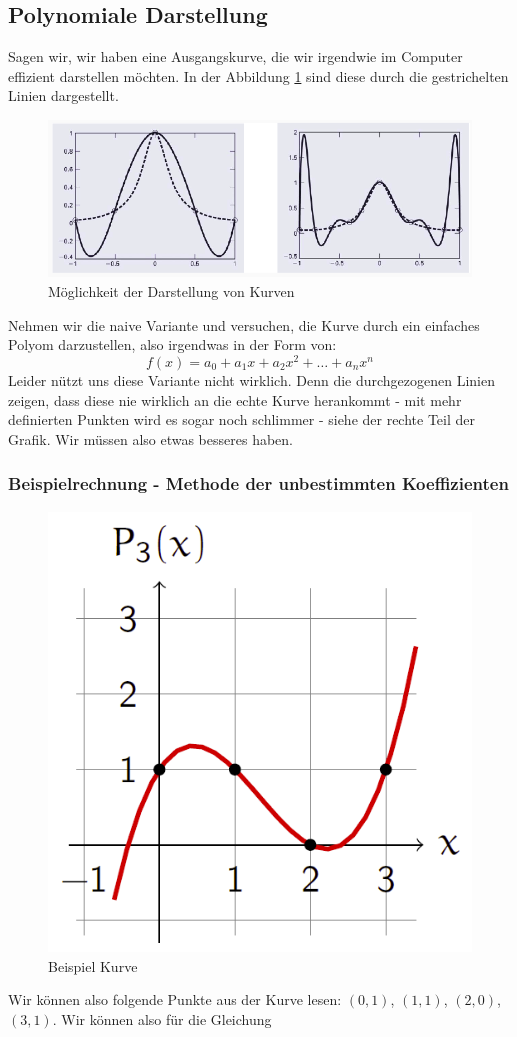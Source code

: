 \subsection{Polynomiale Darstellung}
Sagen wir, wir haben eine Ausgangskurve, die wir irgendwie im Computer effizient darstellen möchten. In der Abbildung \ref{fig:kurven_interpolieren} sind diese durch die gestrichelten Linien dargestellt. 
\begin{figure}[!ht]
	\centering
	\includegraphics[width=0.5\linewidth]{fig/kurven_interpolieren}
	\caption{Möglichkeit der Darstellung von Kurven}
	\label{fig:kurven_interpolieren}
\end{figure}
Nehmen wir die naive Variante und versuchen, die Kurve durch ein einfaches Polyom darzustellen, also irgendwas in der Form von:
\begin{displaymath}
f(x) = a_0 + a_1x + a_2x^2 + \dots + a_nx^n
\end{displaymath}
Leider nützt uns diese Variante nicht wirklich. Denn die durchgezogenen Linien zeigen, dass diese nie wirklich an die echte Kurve herankommt - mit mehr definierten Punkten wird es sogar noch schlimmer - siehe der rechte Teil der Grafik. Wir müssen also etwas besseres haben.

\subsubsection{Beispielrechnung - Methode der unbestimmten Koeffizienten}
\begin{figure}[!ht]
	\centering
	\includegraphics[width=0.3\linewidth]{fig/unbestimmte_koeffizienten}
	\caption{Beispiel Kurve}
	\label{fig:unbestimmte_koeffizienten}
\end{figure}

Wir können also folgende Punkte aus der Kurve lesen: \((0,1)\), \((1,1)\), \((2,0)\), \((3,1)\). Wir können also für die Gleichung

